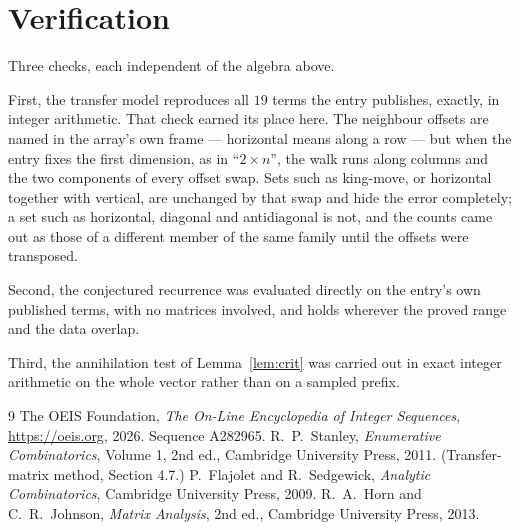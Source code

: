 \documentclass[11pt,a4paper]{article}
\theoremstyle{plain}
\theoremstyle{definition}
\begin{document}
\section{Verification}

Three checks, each independent of the algebra above.

First, the transfer model reproduces all $19$ terms the entry publishes, exactly, in
integer arithmetic. That check earned its place here. The neighbour offsets are named in the
array's own frame --- horizontal means along a row --- but when the entry fixes the first
dimension, as in ``$2\times n$'', the walk runs along columns and the two components of every
offset swap. Sets such as king-move, or horizontal together with vertical, are unchanged by
that swap and hide the error completely; a set such as horizontal, diagonal and antidiagonal
is not, and the counts came out as those of a different member of the same family until the
offsets were transposed.

Second, the conjectured recurrence was evaluated directly on the entry's own published terms,
with no matrices involved, and holds wherever the proved range and the data overlap.

Third, the annihilation test of Lemma~\ref{lem:crit} was carried out in exact integer
arithmetic on the whole vector rather than on a sampled prefix.

\begin{thebibliography}{9}
 The OEIS Foundation, \emph{The On-Line Encyclopedia of Integer
Sequences}, \url{https://oeis.org}, 2026. Sequence A282965.
 R.~P.~Stanley, \emph{Enumerative Combinatorics}, Volume 1, 2nd ed.,
Cambridge University Press, 2011. (Transfer-matrix method, Section 4.7.)
 P.~Flajolet and R.~Sedgewick, \emph{Analytic Combinatorics}, Cambridge
University Press, 2009.
 R.~A.~Horn and C.~R.~Johnson, \emph{Matrix Analysis}, 2nd ed., Cambridge
University Press, 2013.
\end{thebibliography}
\end{document}
